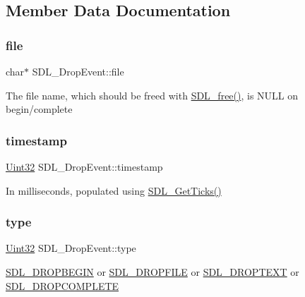 \subsection{Member Data Documentation}
\mbox{\label{struct_s_d_l___drop_event_abc41ef4beb62e1d8b56827128b29585f}} 
\subsubsection{\texorpdfstring{file}{file}}
{\footnotesize\ttfamily char$\ast$ S\+D\+L\+\_\+\+Drop\+Event\+::file}

The file name, which should be freed with \mbox{\hyperlink{_s_d_l__stdinc_8h_a0e4ade894d550ada1fa19dc2d46e88b8}{S\+D\+L\+\_\+free()}}, is N\+U\+LL on begin/complete \mbox{\label{struct_s_d_l___drop_event_a02d2c81bb22db632a40cd0021ff751ab}} 
\subsubsection{\texorpdfstring{timestamp}{timestamp}}
{\footnotesize\ttfamily \mbox{\hyperlink{_s_d_l__stdinc_8h_add440eff171ea5f55cb00c4a9ab8672d}{Uint32}} S\+D\+L\+\_\+\+Drop\+Event\+::timestamp}

In milliseconds, populated using \mbox{\hyperlink{_s_d_l__timer_8h_a0b9bc71d6287e0ffafdc3419760fe2b3}{S\+D\+L\+\_\+\+Get\+Ticks()}} \mbox{\label{struct_s_d_l___drop_event_a5ea27cfaa5f8d4940e9a69b68b3cc035}} 
\subsubsection{\texorpdfstring{type}{type}}
{\footnotesize\ttfamily \mbox{\hyperlink{_s_d_l__stdinc_8h_add440eff171ea5f55cb00c4a9ab8672d}{Uint32}} S\+D\+L\+\_\+\+Drop\+Event\+::type}

\mbox{\hyperlink{_s_d_l__events_8h_a3b589e89be6b35c02e0dd34a55f3fccaa0809886c132aaf734fff6f2abf466912}{S\+D\+L\+\_\+\+D\+R\+O\+P\+B\+E\+G\+IN}} or \mbox{\hyperlink{_s_d_l__events_8h_a3b589e89be6b35c02e0dd34a55f3fccaad9238862d7aeaebff88be6453ee0fbab}{S\+D\+L\+\_\+\+D\+R\+O\+P\+F\+I\+LE}} or \mbox{\hyperlink{_s_d_l__events_8h_a3b589e89be6b35c02e0dd34a55f3fccaa1d97f901333e40b0ccc4dff1a319213f}{S\+D\+L\+\_\+\+D\+R\+O\+P\+T\+E\+XT}} or \mbox{\hyperlink{_s_d_l__events_8h_a3b589e89be6b35c02e0dd34a55f3fccaaa83e80a89d5c4ff14889d07dddc402ef}{S\+D\+L\+\_\+\+D\+R\+O\+P\+C\+O\+M\+P\+L\+E\+TE}} \mbox{\label{struct_s_d_l___drop_event_a8cecd2178cdc04118bf852e7cf7bf647}} 
